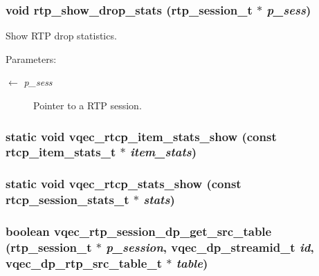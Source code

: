 \subsubsection{\setlength{\rightskip}{0pt plus 5cm}void rtp\_\-show\_\-drop\_\-stats (rtp\_\-session\_\-t $\ast$ {\em p\_\-sess})}\label{vqec__rtp_8c_e10fd8d5553cf71774f8ffa86e1e0c2b}


Show RTP drop statistics.

\begin{Desc}
\item[Parameters:]
\begin{description}
\item[\mbox{$\leftarrow$} {\em p\_\-sess}]Pointer to a RTP session. \end{description}
\end{Desc}
\subsubsection{\setlength{\rightskip}{0pt plus 5cm}static void vqec\_\-rtcp\_\-item\_\-stats\_\-show (const rtcp\_\-item\_\-stats\_\-t $\ast$ {\em item\_\-stats})\hspace{0.3cm}{\tt  [static]}}\label{vqec__rtp_8c_2fb08bd6de601c3a91ac1a66130fb57e}


\subsubsection{\setlength{\rightskip}{0pt plus 5cm}static void vqec\_\-rtcp\_\-stats\_\-show (const rtcp\_\-session\_\-stats\_\-t $\ast$ {\em stats})\hspace{0.3cm}{\tt  [static]}}\label{vqec__rtp_8c_93f48b1529bb121f26982b5b6a0d3a4c}


\subsubsection{\setlength{\rightskip}{0pt plus 5cm}boolean vqec\_\-rtp\_\-session\_\-dp\_\-get\_\-src\_\-table (rtp\_\-session\_\-t $\ast$ {\em p\_\-session}, vqec\_\-dp\_\-streamid\_\-t {\em id}, vqec\_\-dp\_\-rtp\_\-src\_\-table\_\-t $\ast$ {\em table})}\label{vqec__rtp_8c_8a96b722d5fcf873e1ed454e76b3ef21}


